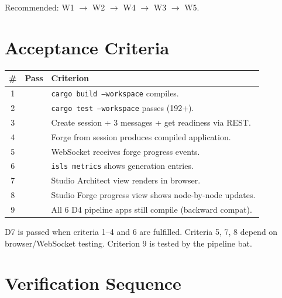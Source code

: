 \documentclass[11pt,a4paper]{article}
\begin{document}
Recommended: W1 $\to$ W2 $\to$ W4 $\to$ W3 $\to$ W5.


\section{Acceptance Criteria}

\begin{longtable}{clp{9cm}}
\toprule
\textbf{\#} & \textbf{Pass} & \textbf{Criterion} \\
\midrule
1 & & \texttt{cargo build --workspace} compiles. \\
2 & & \texttt{cargo test --workspace} passes (192+). \\
3 & & Create session + 3 messages + get readiness via REST. \\
4 & & Forge from session produces compiled application. \\
5 & & WebSocket receives forge progress events. \\
6 & & \texttt{isls metrics} shows generation entries. \\
7 & & Studio Architect view renders in browser. \\
8 & & Studio Forge progress view shows node-by-node updates. \\
9 & & All 6 D4 pipeline apps still compile (backward compat). \\
\bottomrule
\end{longtable}

D7 is passed when criteria 1--4 and 6 are fulfilled.
Criteria 5, 7, 8 depend on browser/WebSocket testing.
Criterion 9 is tested by the pipeline bat.


\section{Verification Sequence}
\end{document}
